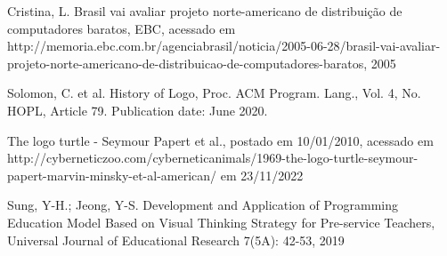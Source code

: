 \documentclass[
12pt,		%
openright,	%
twoside,  %
a4paper,			%
chapter=TITLE,		%
english,			%
french,				%
spanish,			%
brazil				%
]{USPSC-classe/USPSC}
\begin{document}
\begin{flushleft}
\begin{flushleft}
\begin{flushleft}
\begin{flushleft}
[CRISTINA, 2005] Cristina, L. Brasil vai avaliar projeto norte-americano de distribui\c{c}\~ao de computadores baratos, EBC, acessado em http://memoria.ebc.com.br/agenciabrasil/noticia/2005-06-28/brasil-vai-avaliar-projeto-norte-americano-de-distribuicao-de-computadores-baratos, 2005
\end{flushleft}


\end{flushleft}


\end{flushleft}


\end{flushleft}


\begin{flushleft}
\begin{flushleft}
\begin{flushleft}
\begin{flushleft}
[SOLOMON et al., 2020] Solomon, C. et al. History of Logo, Proc. ACM Program. Lang., Vol. 4, No. HOPL, Article 79. Publication date: June 2020.
\end{flushleft}


\end{flushleft}


\end{flushleft}


\end{flushleft}


\begin{flushleft}
\begin{flushleft}
\begin{flushleft}
\begin{flushleft}
[CIBERNECTZOO, 2010] The logo turtle - Seymour Papert et al., postado em 10/01/2010, acessado em http://cyberneticzoo.com/cyberneticanimals/1969-the-logo-turtle-seymour-papert-marvin-minsky-et-al-american/ em 23/11/2022
\end{flushleft}


\end{flushleft}


\end{flushleft}


\end{flushleft}


\begin{flushleft}
\begin{flushleft}
\begin{flushleft}
\begin{flushleft}
[SUNG, 2019] Sung, Y-H.; Jeong, Y-S. Development and Application of Programming Education Model Based on Visual Thinking Strategy for Pre-service Teachers, Universal Journal of Educational Research 7(5A): 42-53, 2019
\end{flushleft}


\end{flushleft}


\end{flushleft}


\end{flushleft}
\end{document}
